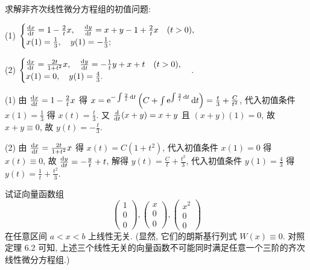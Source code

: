 


\begin{exercise}
  求解非齐次线性微分方程组的初值问题:

  (1) $\begin{cases}
    \frac{\mathop{}\!\mathrm{d} x}{\mathop{}\!\mathrm{d} t} = 1-\frac{2}{t}x,\quad\frac{\mathop{}\!\mathrm{d} y}{\mathop{}\!\mathrm{d} t}=x+y-1+\frac{2}{t}x\quad(t>0),\\
    x(1) = \frac{1}{3},\quad y(1)=-\frac{1}{3};\end{cases}$

  (2) $\begin{cases}
  \frac{\mathop{}\!\mathrm{d} x}{\mathop{}\!\mathrm{d} t}=\frac{2t}{1+t^2}x,\quad\frac{\mathop{}\!\mathrm{d} y}{\mathop{}\!\mathrm{d} t}=-\frac{1}{t}y+x+t\quad(t>0),\\
  x(1)=0,\quad y(1)=\frac{4}{3}.
  \end{cases}$.
\end{exercise}

\begin{solution}
  (1) 由 $\frac{\mathop{}\!\mathrm{d} x}{\mathop{}\!\mathrm{d} t}=1-\frac{2}{t}x$ 得 
  $x=\mathrm{e}^{-\int\frac{2}{t}\mathop{}\!\mathrm{d} t}\left(C+\int\mathrm{e}^{\int\frac{2}{t}\mathop{}\!\mathrm{d} t}\mathop{}\!\mathrm{d} t\right)=\frac{t}{3}+\frac{C}{t^2}$, 
  代入初值条件 $x(1)=\frac{1}{3}$ 得 $x(t)=\frac{t}{3}$. 
  又 $\frac{\mathop{}\!\mathrm{d}}{\mathop{}\!\mathrm{d} t}(x+y)=x+y$ 且 $(x+y)(1)=0$, 
  故 $x+y\equiv 0$, 故 $y(t)=-\frac{t}{3}$.

  (2) 由 $\frac{\mathop{}\!\mathrm{d} x}{\mathop{}\!\mathrm{d} t}=\frac{2t}{1+t^2}x$ 得 $x(t)=C(1+t^2)$, 
  代入初值条件 $x(1)=0$ 得 $x(t)\equiv 0$, 
  故 $\frac{\mathop{}\!\mathrm{d} y}{\mathop{}\!\mathrm{d} t}=-\frac{y}{t}+t$, 
  解得 $y(t)=\frac{C}{t}+\frac{t^2}{3}$, 
  代入初值条件 $y(1)=\frac{4}{3}$ 得 $y(t)=\frac{1}{t}+\frac{t^2}{3}$.
\end{solution}



\begin{exercise}
  试证向量函数组
  \[\begin{pmatrix}1\\0\\0\end{pmatrix},\begin{pmatrix}x\\0\\0\end{pmatrix},\begin{pmatrix}x^2\\0\\0\end{pmatrix}\]
  在任意区间 $a<x<b$ 上线性无关. (显然, 它们的朗斯基行列式 $W(x)\equiv 0$. 对照定理 6.2 可知, 
  上述三个线性无关的向量函数不可能同时满足任意一个三阶的齐次线性微分方程组.)
\end{exercise}

